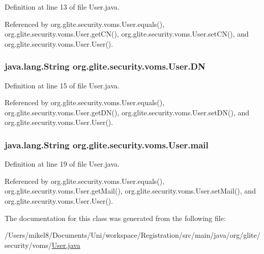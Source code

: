 Definition at line 13 of file User.java.



Referenced by org.glite.security.voms.User.equals(), org.glite.security.voms.User.getCN(), org.glite.security.voms.User.setCN(), and org.glite.security.voms.User.User().

\hypertarget{classorg_1_1glite_1_1security_1_1voms_1_1User_aa572a6fe0e875ec244c516a958d7a8e8}{
\subsubsection[{DN}]{\setlength{\rightskip}{0pt plus 5cm}java.lang.String {\bf org.glite.security.voms.User.DN}}}
\label{classorg_1_1glite_1_1security_1_1voms_1_1User_aa572a6fe0e875ec244c516a958d7a8e8}


Definition at line 15 of file User.java.



Referenced by org.glite.security.voms.User.equals(), org.glite.security.voms.User.getDN(), org.glite.security.voms.User.setDN(), and org.glite.security.voms.User.User().

\hypertarget{classorg_1_1glite_1_1security_1_1voms_1_1User_a0929e9a6327b46a6196fd741c8d5d09c}{
\subsubsection[{mail}]{\setlength{\rightskip}{0pt plus 5cm}java.lang.String {\bf org.glite.security.voms.User.mail}}}
\label{classorg_1_1glite_1_1security_1_1voms_1_1User_a0929e9a6327b46a6196fd741c8d5d09c}


Definition at line 19 of file User.java.



Referenced by org.glite.security.voms.User.equals(), org.glite.security.voms.User.getMail(), org.glite.security.voms.User.setMail(), and org.glite.security.voms.User.User().



The documentation for this class was generated from the following file:\begin{DoxyCompactItemize}
\item 
/Users/mikel8/Documents/Uni/workspace/Registration/src/main/java/org/glite/security/voms/\hyperlink{User_8java}{User.java}\end{DoxyCompactItemize}
